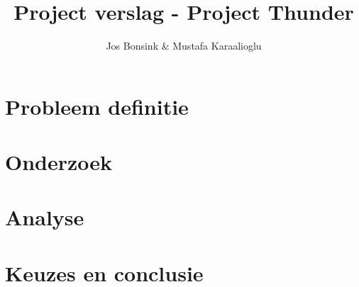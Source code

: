 \documentclass[12pt]{article}
\author{Jos Bonsink \& Mustafa Karaalioglu}
\begin{document}
\title{Project verslag - Project Thunder}
\maketitle

\section{Probleem definitie}

\section{Onderzoek}

\section{Analyse}

\section{Keuzes en conclusie}
\end{document}
